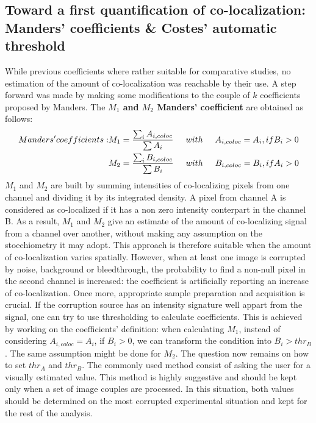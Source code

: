 \documentclass[]{spie}  %
\begin{document}
\subsection{Toward a first quantification of co-localization: Manders' coefficients \& Costes' automatic threshold}
\label{sec:MM_manders_CAThr}
While previous coefficients where rather suitable for comparative studies, no estimation of the amount of co-localization was reachable by their use. A step forward was made by making some modifications to the couple of $k$ coefficients proposed by Manders\cite{Manders1992}. The \textbf{$M_1$ and $M_2$ Manders' coefficient} are obtained as follows:
\begin{eqnarray}
Manders' coefficients: &M_1=\frac{\sum_{i}A_{i, coloc}}{\sum A_i} \hspace{0.5cm} with \hspace{0.5cm} A_{i, coloc}=A_i, if B_i>0 \\
&M_2=\frac{\sum_{i}B_{i, coloc}}{\sum B_i} \hspace{0.5cm} with \hspace{0.5cm} B_{i, coloc}=B_i, if A_i>0
\label{eqn:M1M2}
\end{eqnarray}
$M_1$ and $M_2$ are built by summing intensities of co-localizing pixels from one channel and dividing it by its integrated density. A pixel from channel A is considered as co-localized if it has a non zero intensity conterpart in the channel B. As a result, $M_1$ and $M_2$ give an estimate of the amount of co-localizing signal from a channel over another, without making any assumption on the stoechiometry it may adopt. This approach is therefore suitable when the amount of co-localization varies spatially. However, when at least one image is corrupted by noise, background or bleedthrough, the probability to find a non-null pixel in the second channel is increased: the coefficient is artificially reporting an increase of co-localization. Once more, appropriate sample preparation and acquisition is crucial. If the corruption source has an intensity signature well appart from the signal, one can try to use thresholding to calculate coefficients. This is achieved by working on the coefficients' definition: when calculating $M_1$, instead of considering $A_{i, coloc}=A_i$, if $B_i>0$, we can transform the condition into $B_i>thr_B$. The same assumption might be done for $M_2$. The question now remains on how to set $thr_A$ and $thr_B$. The commonly used method consist of asking the user for a visually estimated value. This method is highly suggestive and should be kept only when a set of image couples are processed. In this situation, both values should be determined on the most corrupted experimental situation and kept for the rest of the analysis.\\
\end{document}

